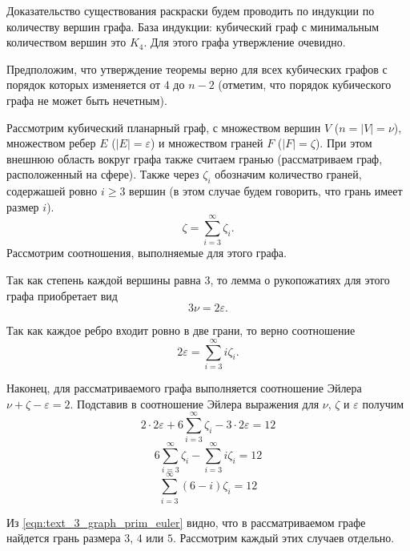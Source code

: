 Доказательство существования раскраски будем проводить по индукции по количеству вершин графа.
База индукции: кубический граф с минимальным количеством вершин это $K_4$.
Для этого графа утвержление очевидно.

Предположим, что утверждение теоремы верно для всех кубических графов с порядок которых изменяется от $4$ до $n - 2$ (отметим, что порядок кубического графа не может быть нечетным).

Рассмотрим кубический планарный граф, с множеством вершин $V$ ($n = |V| = \nu$), множеством ребер $E$ ($|E| = \varepsilon$) и множеством граней $F$ ($|F| = \zeta$).
При этом внешнюю область вокруг графа также считаем гранью (рассматриваем граф, расположенный на сфере).
Также через $\zeta_i$ обозначим количество граней, содержашей ровно $i \ge 3$ вершин (в этом случае будем говорить, что грань имеет размер $i$).
\begin{equation}
	\zeta = \sum_{i = 3}^{\infty}{\zeta_i}.
\end{equation}
Рассмотрим соотношения, выполняемые для этого графа.

Так как степень каждой вершины равна $3$, то лемма о рукопожатиях для этого графа приобретает вид
\begin{equation}
	3 \nu = 2 \varepsilon.
\end{equation}

Так как каждое ребро входит ровно в две грани, то верно соотношение
\begin{equation}
	2 \varepsilon = \sum_{i = 3}^{\infty}{i \zeta_i}.
\end{equation}

Наконец, для рассматриваемого графа выполняется соотношение Эйлера $\nu + \zeta - \varepsilon = 2$.
Подставив в соотношение Эйлера выражения для $\nu$, $\zeta$ и $\varepsilon$ получим
\begin{equation}
	2 \cdot 2\varepsilon + 6 \sum_{i = 3}^{\infty}{\zeta_i} - 3 \cdot 2\varepsilon = 12
\end{equation}
\begin{equation}
	6 \sum_{i = 3}^{\infty}{\zeta_i} - \sum_{i = 3}^{\infty}{i \zeta_i} = 12
\end{equation}
\begin{equation}\label{eqn:text_3_graph_prim_euler}
	\sum_{i = 3}^{\infty}{(6 - i) \zeta_i} = 12
\end{equation}

Из \eqref{eqn:text_3_graph_prim_euler} видно, что в рассматриваемом графе найдется грань размера $3$, $4$ или $5$.
Рассмотрим каждый этих случаев отдельно.

